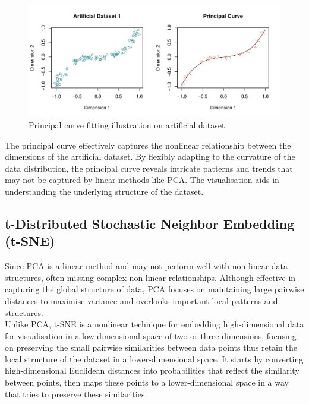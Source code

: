 \documentclass{article}\usepackage[]{graphicx}\usepackage[]{xcolor}
\makeatletter
\def\maxwidth{ %
  \ifdim\Gin@nat@width>\linewidth
    \linewidth
  \else
    \Gin@nat@width
  \fi
}
\newenvironment{knitrout}{}{} %
\numberwithin{equation}{section}
\makeatother
\begin{document}
\begin{knitrout}\scriptsize
{}\color{fgcolor}\begin{figure}[H]

{\centering \includegraphics[width=\maxwidth]{figure/beamer-P-curves-1} 

}

\caption[Principal curve fitting illustration on artificial dataset]{Principal curve fitting illustration on artificial dataset}\label{fig:P-curves}
\end{figure}

\end{knitrout}

\noindent The principal curve effectively captures the nonlinear relationship between the dimensions of the artificial dataset. By flexibly adapting to the curvature of the data distribution, the principal curve reveals intricate patterns and trends that may not be captured by linear methods like PCA. The visualisation aids in understanding the underlying structure of the dataset.


\subsection{t-Distributed Stochastic Neighbor Embedding (t-SNE)}

Since PCA is a linear method and may not perform well with non-linear data structures, often missing complex non-linear relationships. Although effective in capturing the global structure of data, PCA focuses on maintaining large pairwise distances to maximise variance and overlooks important local patterns and structures. \\

\noindent
Unlike PCA, t-SNE\cite{vanderMaaten2008tsne} is a nonlinear technique for embedding high-dimensional data for visualisation in a low-dimensional space of two or three dimensions, focusing on preserving the small pairwise similarities between data points thus retain the local structure of the dataset in a lower-dimensional space. It starts by converting high-dimensional Euclidean distances into probabilities that reflect the similarity between points, then maps these points to a lower-dimensional space in a way that tries to preserve these similarities.
\end{document}
